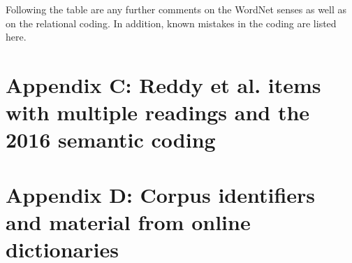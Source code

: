 \noindent
Following the table are any further comments on the WordNet senses as well as on the relational coding. In addition, known mistakes in the coding are listed here.


\chapter[Appendix C: Multiple readings and the 2016 coding]{Appendix C: Reddy et al. items with multiple readings and the 2016 semantic coding}


\chapter[Appendix D: Corpus and dictionary sources]{Appendix D: Corpus identifiers and material from online dictionaries}



\sloppy
\printbibliography[heading=references] 
\cleardoublepage

{} 
\printindex 
\cleardoublepage
  
{}
\printindex[lan] 
\cleardoublepage
  
{}
\printindex[sbj]
\ohead{} 
